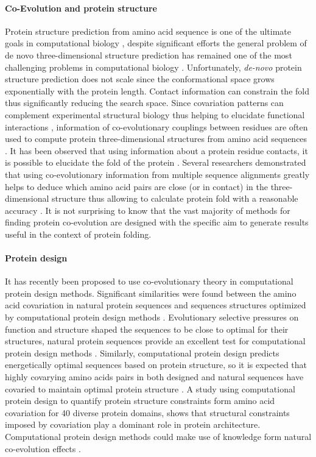 \paragraph{Co-Evolution and protein structure}
Protein structure prediction from amino acid sequence is one of the ultimate goals in computational biology \cite{burger2010disentangling}, despite significant efforts the general problem of de novo three-dimensional structure prediction has remained one of the most challenging problems in computational biology \cite{marks2012protein}.
Unfortunately, \textit{de-novo} protein structure prediction does not scale since the conformational space grows exponentially with the protein length.
Contact information can constrain the fold thus significantly reducing the search space.
Since covariation patterns can complement experimental structural biology thus helping to elucidate functional interactions  \cite{marks2012protein}, information of co-evolutionary couplings between residues are often used to compute protein three-dimensional structures from amino acid sequences \cite{marks2012protein}.
It has been observed that using information about a protein residue contacts, it is possible to elucidate the fold of the protein \cite{jones2012psicov}.
Several researchers demonstrated that using co-evolutionary information from multiple sequence alignments greatly helps to deduce which amino acid pairs are close (or in contact) in the three-dimensional structure thus allowing to calculate protein fold with a reasonable accuracy \cite{marks2012protein}.
It is not surprising to know that the vast majority of methods for finding protein co-evolution are designed with the specific aim to generate results useful in the context of protein folding.

\paragraph{Protein design}
It has recently been proposed to use co-evolutionary theory in computational protein design methods.
Significant similarities were found between the amino acid covariation in natural protein sequences and sequences structures optimized by computational protein design methods \cite{ollikainen2013computational}.
Evolutionary selective pressures on function and structure shaped the sequences to be close to optimal for their structures, natural protein sequences provide an excellent test for computational protein design methods \cite{ollikainen2013computational}.
Similarly, computational protein design predicts energetically optimal sequences based on protein structure, so it is expected that highly covarying amino acids pairs in both designed and natural sequences have covaried to maintain optimal protein structure \cite{ollikainen2013computational}.
A study \cite{ollikainen2013computational} using computational protein design to quantify protein structure constraints form amino acid covariation for 40 diverse protein domains, shows that structural constraints imposed by covariation play a dominant role in protein architecture.
Computational protein design methods could make use of knowledge form natural co-evolution effects \cite{ollikainen2013computational}.

